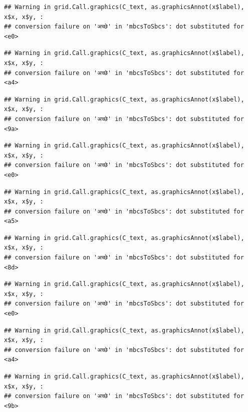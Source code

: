 \documentclass[
]{article}
\begin{document}
\begin{verbatim}
## Warning in grid.Call.graphics(C_text, as.graphicsAnnot(x$label), x$x, x$y, :
## conversion failure on 'अच्छे' in 'mbcsToSbcs': dot substituted for <e0>
\end{verbatim}

\begin{verbatim}
## Warning in grid.Call.graphics(C_text, as.graphicsAnnot(x$label), x$x, x$y, :
## conversion failure on 'अच्छे' in 'mbcsToSbcs': dot substituted for <a4>
\end{verbatim}

\begin{verbatim}
## Warning in grid.Call.graphics(C_text, as.graphicsAnnot(x$label), x$x, x$y, :
## conversion failure on 'अच्छे' in 'mbcsToSbcs': dot substituted for <9a>
\end{verbatim}

\begin{verbatim}
## Warning in grid.Call.graphics(C_text, as.graphicsAnnot(x$label), x$x, x$y, :
## conversion failure on 'अच्छे' in 'mbcsToSbcs': dot substituted for <e0>
\end{verbatim}

\begin{verbatim}
## Warning in grid.Call.graphics(C_text, as.graphicsAnnot(x$label), x$x, x$y, :
## conversion failure on 'अच्छे' in 'mbcsToSbcs': dot substituted for <a5>
\end{verbatim}

\begin{verbatim}
## Warning in grid.Call.graphics(C_text, as.graphicsAnnot(x$label), x$x, x$y, :
## conversion failure on 'अच्छे' in 'mbcsToSbcs': dot substituted for <8d>
\end{verbatim}

\begin{verbatim}
## Warning in grid.Call.graphics(C_text, as.graphicsAnnot(x$label), x$x, x$y, :
## conversion failure on 'अच्छे' in 'mbcsToSbcs': dot substituted for <e0>
\end{verbatim}

\begin{verbatim}
## Warning in grid.Call.graphics(C_text, as.graphicsAnnot(x$label), x$x, x$y, :
## conversion failure on 'अच्छे' in 'mbcsToSbcs': dot substituted for <a4>
\end{verbatim}

\begin{verbatim}
## Warning in grid.Call.graphics(C_text, as.graphicsAnnot(x$label), x$x, x$y, :
## conversion failure on 'अच्छे' in 'mbcsToSbcs': dot substituted for <9b>
\end{verbatim}
\end{document}
